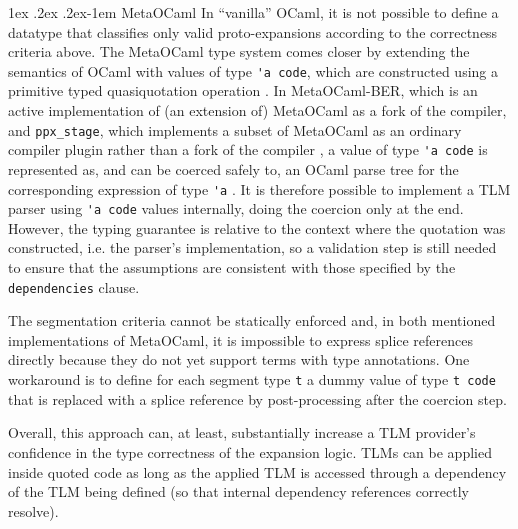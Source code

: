 \documentclass[acmsmall]{acmart}
\makeatletter
\renewcommand{\subsubsection}{%
  \@startsection{subsubsection}{3}%
  {\z@}{1ex \@plus .2ex \@minus .2ex}{-1em}%
  {\normalfont\normalsize\bfseries}%
}
\newcommand{\li}[1]{\lstinline[basicstyle=\ttfamily\fontsize{9pt}{1em}\selectfont]{#1}}
\makeatother
\begin{document}
\subsubsection{MetaOCaml}\label{sec:metaocaml} In ``vanilla'' OCaml, it is not possible to define a datatype that classifies only valid proto-expansions according to the correctness criteria above. The MetaOCaml type system comes closer by extending the semantics of OCaml with values of type \li{'a code}, which are constructed using a primitive typed quasiquotation operation \cite{DBLP:conf/flops/Kiselyov14,taha2004gentle}. In MetaOCaml-BER, which is an active implementation of (an extension of) MetaOCaml as a fork of the compiler, and \li{ppx_stage}, which implements a subset of MetaOCaml as an ordinary compiler plugin rather than a fork of the compiler \cite{ppxstage}, a value of type \li{'a code} is represented as, and can be coerced safely to, an OCaml parse tree for the corresponding expression of type \li{'a} \cite{DBLP:conf/flops/Kiselyov14}. It is therefore possible to implement a TLM parser using \li{'a code} values internally, doing the coercion only at the end. However, the typing guarantee is relative to the context where the quotation was constructed, i.e. the parser's implementation, so a validation step is still needed to ensure that the assumptions are consistent with those specified by the \li{dependencies} clause. 

The segmentation criteria cannot be statically enforced and, in both mentioned implementations of MetaOCaml, it is impossible to express splice references directly because they do not yet support terms with type annotations. One workaround is to define for each  segment type \li{t} a dummy value of type \li{t code} that is replaced with a splice reference by post-processing after the coercion step. 

Overall, this approach can, at least, substantially increase a TLM provider's confidence in the type correctness of the expansion logic. 
TLMs can be applied inside quoted code as long as the applied TLM is accessed through a dependency of the TLM being defined (so that internal dependency references correctly resolve). %
\end{document}
